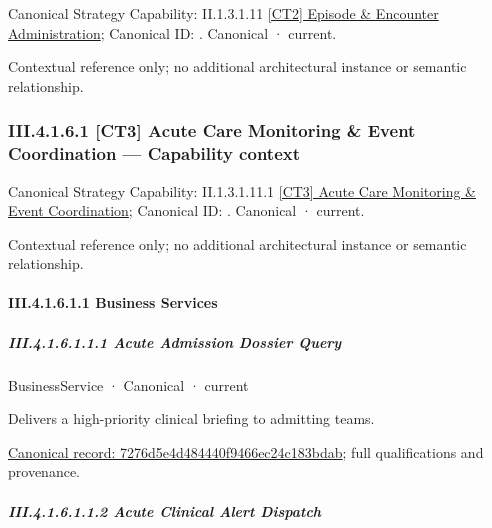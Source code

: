 {\small Canonical Strategy Capability: II.1.3.1.11 \hyperref[element:61d7067aee0540259b3daca4287d66d2]{[CT2] Episode \& Encounter Administration}; Canonical ID: \texttt{}. Canonical · current.}\par
Contextual reference only; no additional architectural instance or semantic relationship.\par
\subsubsection*{III.4.1.6.1 [CT3] Acute Care Monitoring \& Event Coordination — Capability context}
\label{navigation:III.4.1.6.1}

{\small Canonical Strategy Capability: II.1.3.1.11.1 \hyperref[element:ee17b26b8c874cc3af50d07a787ce488]{[CT3] Acute Care Monitoring \& Event Coordination}; Canonical ID: \texttt{}. Canonical · current.}\par
Contextual reference only; no additional architectural instance or semantic relationship.\par
\paragraph*{III.4.1.6.1.1 Business Services}
\label{navigation:III.4.1.6.1.1}

\subparagraph*{III.4.1.6.1.1.1 Acute Admission Dossier Query}
\label{navigation:III.4.1.6.1.1.1}

\label{element:7276d5e4d484440f9466ec24c183bdab}
{\small BusinessService · Canonical · current}\par

Delivers a high-priority clinical briefing to admitting teams.


{\footnotesize \href{../../../../continuum/business/business-service/7276d5e4d484440f9466ec24c183bdab.md}{Canonical record: 7276d5e4d484440f9466ec24c183bdab}; full qualifications and provenance.}\par
\subparagraph*{III.4.1.6.1.1.2 Acute Clinical Alert Dispatch}
\label{navigation:III.4.1.6.1.1.2}

